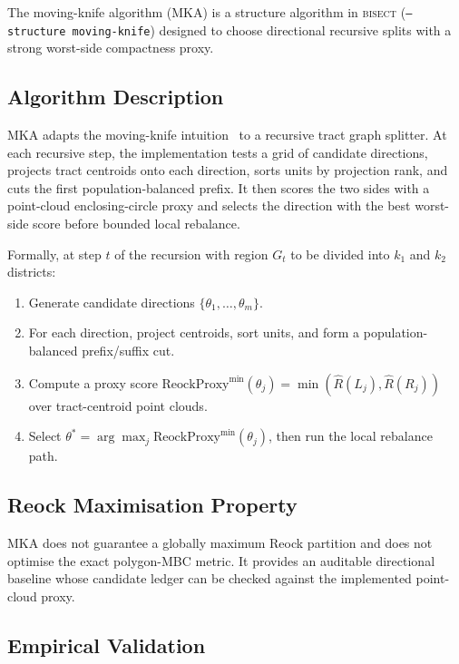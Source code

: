 The moving-knife algorithm (MKA) is a structure algorithm in \textsc{bisect}
(\texttt{--structure moving-knife}) designed to choose directional recursive
splits with a strong worst-side compactness proxy.

\subsection{Algorithm Description}

MKA adapts the moving-knife intuition~\citep{brams2000win} to a recursive
tract graph splitter.  At each recursive step, the implementation tests a grid
of candidate directions, projects tract centroids onto each direction, sorts
units by projection rank, and cuts the first population-balanced prefix.  It
then scores the two sides with a point-cloud enclosing-circle proxy and selects
the direction with the best worst-side score before bounded local rebalance.

Formally, at step $t$ of the recursion with region $G_t$ to be divided into
$k_1$ and $k_2$ districts:
\begin{enumerate}
  \item Generate candidate directions $\{\theta_1, \ldots, \theta_m\}$.
  \item For each direction, project centroids, sort units, and form a
    population-balanced prefix/suffix cut.
  \item Compute a proxy score
    $\text{ReockProxy}^{\min}(\theta_j) =
    \min(\widehat R(L_j), \widehat R(R_j))$ over tract-centroid point clouds.
  \item Select $\theta^* = \arg\max_j \text{ReockProxy}^{\min}(\theta_j)$,
    then run the local rebalance path.
\end{enumerate}

\subsection{Reock Maximisation Property}

MKA does not guarantee a globally maximum Reock partition and does not optimise
the exact polygon-MBC metric.  It provides an auditable directional baseline
whose candidate ledger can be checked against the implemented point-cloud proxy.

\subsection{Empirical Validation}

